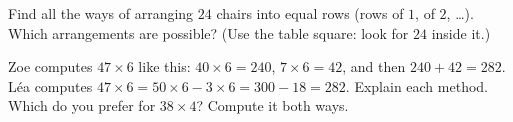 \begin{exercise}[$\star\star$]\label{exo:g3:mult:11}
Find all the ways of arranging $24$ chairs into equal rows (rows of
$1$, of $2$, \dots). Which arrangements are possible? (Use the table
square: look for $24$ inside it.)
\end{exercise}

\begin{exercise}[$\star\star$]\label{exo:g3:mult:12}
Zoe computes $47 \times 6$ like this: $40 \times 6 = 240$,
$7 \times 6 = 42$, and then $240 + 42 = 282$. Léa computes
$47 \times 6 = 50 \times 6 - 3 \times 6 = 300 - 18 = 282$. Explain
each method. Which do you prefer for $38 \times 4$? Compute it both
ways.
\end{exercise}
